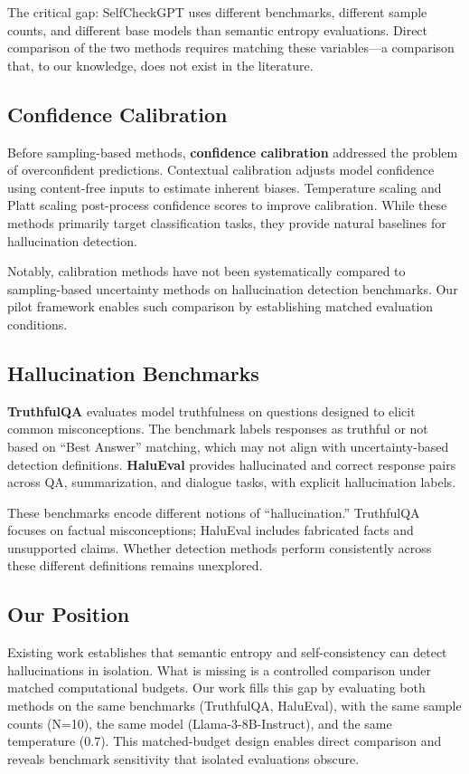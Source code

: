 The critical gap: SelfCheckGPT uses different benchmarks, different sample counts, and different base models than semantic entropy evaluations. Direct comparison of the two methods requires matching these variables---a comparison that, to our knowledge, does not exist in the literature.

\subsection{Confidence Calibration}

Before sampling-based methods, \textbf{confidence calibration} addressed the problem of overconfident predictions. Contextual calibration \cite{zhao2021calibrate} adjusts model confidence using content-free inputs to estimate inherent biases. Temperature scaling and Platt scaling \cite{guo2017calibration} post-process confidence scores to improve calibration. While these methods primarily target classification tasks, they provide natural baselines for hallucination detection.

Notably, calibration methods have not been systematically compared to sampling-based uncertainty methods on hallucination detection benchmarks. Our pilot framework enables such comparison by establishing matched evaluation conditions.

\subsection{Hallucination Benchmarks}

\textbf{TruthfulQA} \cite{lin2022truthfulqa} evaluates model truthfulness on questions designed to elicit common misconceptions. The benchmark labels responses as truthful or not based on ``Best Answer'' matching, which may not align with uncertainty-based detection definitions. \textbf{HaluEval} \cite{li2023halueval} provides hallucinated and correct response pairs across QA, summarization, and dialogue tasks, with explicit hallucination labels.

These benchmarks encode different notions of ``hallucination.'' TruthfulQA focuses on factual misconceptions; HaluEval includes fabricated facts and unsupported claims. Whether detection methods perform consistently across these different definitions remains unexplored.

\subsection{Our Position}

Existing work establishes that semantic entropy and self-consistency can detect hallucinations in isolation. What is missing is a controlled comparison under matched computational budgets. Our work fills this gap by evaluating both methods on the same benchmarks (TruthfulQA, HaluEval), with the same sample counts (N=10), the same model (Llama-3-8B-Instruct), and the same temperature (0.7). This matched-budget design enables direct comparison and reveals benchmark sensitivity that isolated evaluations obscure.
